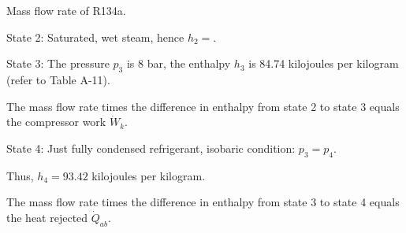 Mass flow rate of R134a.

State 2: Saturated, wet steam, hence \( h_2 = \).

State 3: The pressure \( p_3 \) is 8 bar, the enthalpy \( h_3 \) is 84.74 kilojoules per kilogram (refer to Table A-11).

The mass flow rate times the difference in enthalpy from state 2 to state 3 equals the compressor work \( \dot{W}_k \).

State 4: Just fully condensed refrigerant, isobaric condition: \( p_3 = p_4 \).

Thus, \( h_4 = 93.42 \) kilojoules per kilogram.

The mass flow rate times the difference in enthalpy from state 3 to state 4 equals the heat rejected \( \dot{Q}_{ab} \).